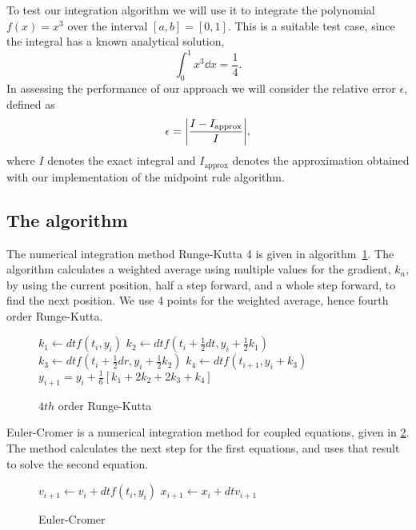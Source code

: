 \documentclass[english,notitlepage,reprint,nofootinbib]{revtex4-1}  %
\begin{document}
	To test our integration algorithm we will use it to integrate the polynomial $f(x) = x^3$ over the interval $[a,b] = [0,1]$. This is a suitable test case, since the integral has a known analytical solution,
	\begin{equation}
		\int_0^1 x^3 \dd x = \frac{1}{4}.
	\end{equation}
	In assessing the performance of our approach we will consider the relative error $\epsilon$, defined as
	\begin{equation}
		\epsilon = \abs{ \frac{I - I_{\text{approx}}}{I} },
	\end{equation}
	where $I$ denotes the exact integral and $I_\text{approx}$ denotes the approximation obtained with our implementation of the midpoint rule algorithm.
	
	
\subsection*{The algorithm}
%
The numerical integration method Runge-Kutta 4 is given in algorithm~\ref{algo:rk4}. The algorithm calculates a weighted average using multiple values for the gradient, $k_n$, by using the current position, half a step forward, and a whole step forward, to find the next position. We use 4 points for the weighted average, hence fourth order Runge-Kutta.

%
\begin{figure}
	\begin{algorithm}[H]
		\caption{$4th$ order Runge-Kutta}
		\label{algo:rk4}
		\begin{algorithmic}
			\State $k_1 \leftarrow dt f(t_i, y_i)$  
			\State $k_2 \leftarrow dt f(t_i + \frac{1}{2}dt, y_i + \frac{1}{2}k_1)$
			\State $k_3 \leftarrow dt f(t_i + \frac{1}{2}dr, y_i + \frac{1}{2}k_2) $
			\State $k_4 \leftarrow dt f(t_{i+1}, y_i + k_3)$
			\State $y_{i+1} = y_i + \frac{1}{6}[k_1 + 2k_2 + 2k_3 + k_4]$
			\EndProcedure
		\end{algorithmic}
	\end{algorithm}
\end{figure}
Euler-Cromer is a numerical integration method for coupled equations, given in \ref{algo:ec}. The method calculates the next step for the first equations, and uses that result to solve the second equation.
\begin{figure}
	\begin{algorithm}[H]
		\caption{Euler-Cromer}
		\label{algo:ec}
		\begin{algorithmic}
			\Procedure{EC}{$v, x, dt, f$}
			\State $v_{i+1} \leftarrow v_i + dt f(t_i, y_i)$
			\State $x_{i+1} \leftarrow x_i + dt v_{i+1}$
			\EndProcedure
		\end{algorithmic}
	\end{algorithm}
\end{figure}
\end{document}
